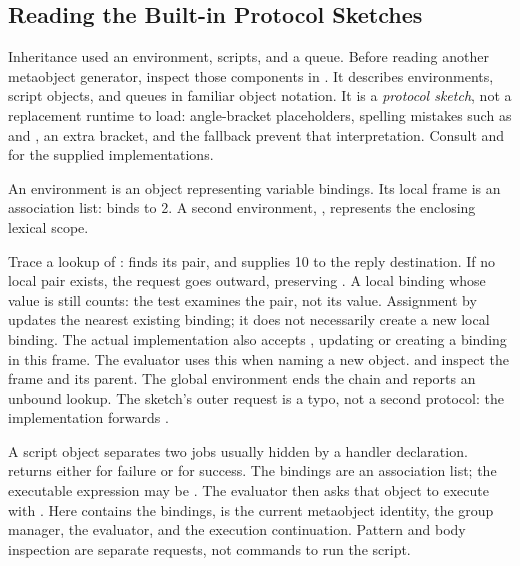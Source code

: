 \subsection{Reading the Built-in Protocol Sketches}
\label{sec:builtin-reading}

Inheritance used an environment, scripts, and a queue. Before reading
another metaobject generator, inspect those components in
. It describes environments,
script objects, and queues in familiar object notation. It is a
\emph{protocol sketch}, not a replacement runtime to load:
angle-bracket placeholders, spelling mistakes such as 
and , an extra bracket, and the  fallback
prevent that interpretation. Consult 
and  for the supplied implementations.

An environment is an object representing variable bindings. Its local
frame is an association list: 
binds  to 2. A second environment, ,
represents the enclosing lexical scope.


Trace a lookup of :  finds its pair, and
 supplies 10 to the reply destination. If no local pair exists,
the request goes outward, preserving .
A local binding whose value is  still counts:
the test examines the pair, not its value. Assignment by 
updates the nearest existing binding; it does not necessarily create a
new local binding. The actual implementation also accepts
, updating or creating a binding in
this frame. The evaluator uses this when naming a new object.
 and  inspect the frame and its parent.
The global environment ends the chain and reports an unbound lookup.
The sketch's outer  request is a typo, not a second
protocol: the implementation forwards .

A script object separates two jobs usually hidden by a handler
declaration.  returns either
 for failure or  for
success. The bindings are an association list; the executable expression
may be . The evaluator then asks that object
to execute with . Here 
contains the bindings,  is the current metaobject identity,
 the group manager,  the evaluator, and 
the execution continuation. Pattern and body inspection are separate
requests, not commands to run the script.

